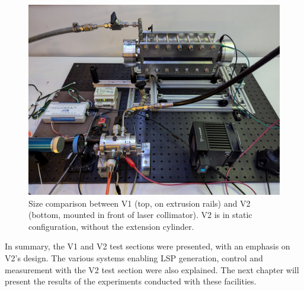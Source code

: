         \begin{figure}[!ht]
            \centering
            \includegraphics[width=\textwidth]{assets/3 design/V1 V2 comparison.png}
            \caption{Size comparison between V1 (top, on extrusion rails) and V2 (bottom, mounted in front of laser collimator). V2 is in static configuration, without the extension cylinder.}
        \end{figure} 

In summary, the V1 and V2 test sections were presented, with an emphasis on V2's design. The various systems enabling LSP generation, control and measurement with the V2 test section were also explained. The next chapter will present the results of the experiments conducted with these facilities.